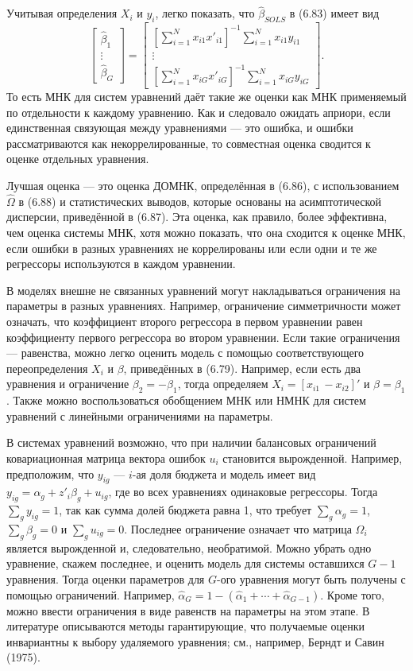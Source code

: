 Учитывая определения $X_i$ и $y_i$, легко показать, что $\hat{\beta}_{SOLS}$ в (6.83) имеет вид
\[
\begin{bmatrix} \hat{\beta}_1 \\ \vdots \\ \hat{\beta}_G \end{bmatrix} = \begin{bmatrix} \left[ \sum_{i=1}^N x_{i1} x'_{i1} \right]^{-1} \sum_{i=1}^N x_{i1} y_{i1} \\ \vdots \\ \left[ \sum_{i=1}^N x_{iG} x'_{iG} \right]^{-1} \sum_{i=1}^N x_{iG} y_{iG} \end{bmatrix}.
\]
То есть МНК для систем уравнений даёт такие же оценки как МНК применяемый по отдельности к каждому уравнению.  Как и следовало ожидать априори, если единственная связующая между уравнениями --- это ошибка, и ошибки рассматриваются как некоррелированные, то совместная оценка сводится к оценке отдельных уравнения.

Лучшая оценка --- это оценка ДОМНК, определённая в (6.86), с использованием $\hat{\Omega}$ в (6.88) и статистических выводов, которые основаны на асимптотической дисперсии, приведённой в (6.87). Эта оценка, как правило, более эффективна, чем оценка системы МНК, хотя можно показать, что она сходится к оценке МНК, если ошибки в разных  уравнениях не коррелированы или если одни и те же регрессоры используются в каждом уравнении.

В моделях внешне не связанных уравнений могут накладываться ограничения на параметры в разных уравнениях. Например, ограничение симметричности может означать, что коэффициент второго регрессора в первом уравнении равен коэффициенту первого регрессора во втором уравнении. Если такие ограничения --- равенства, можно легко оценить модель с помощью соответствующего переопределения $X_i$ и $\beta$, приведённых в (6.79). Например, если есть два уравнения и ограничение $\beta_2=-\beta_1$, тогда определяем $X_i=[x_{i1} \, -x_{i2}]'$ и $\beta=\beta_1$. Также можно воспользоваться обобщением МНК или НМНК для систем уравнений с линейными ограничениями на параметры.

В системах уравнений возможно, что при наличии балансовых ограничений ковариационная матрица вектора ошибок $u_i$ становится вырожденной. Например, предположим, что $y_{ig}$ --- $i$-ая доля бюджета и модель имеет вид $y_{ig}= \alpha_g + z'_i \beta_g + u_{ig}$, где во всех уравнениях одинаковые регрессоры. Тогда $\sum_g y_{ig}=1$, так как сумма долей бюджета равна 1, что требует $\sum_g \alpha_{g}=1$, $\sum_g \beta_{g}=0$ и $\sum_g u_{ig}=0$. Последнее ограничение означает что матрица $\Omega_i$ является вырожденной и, следовательно, необратимой. Можно убрать одно уравнение, скажем последнее, и оценить модель для системы оставшихся $G-1$ уравнения. Тогда оценки параметров для $G$-ого уравнения могут быть получены с помощью ограничений. Например, $\hat{\alpha}_G=1-(\hat{\alpha}_1 + \cdots + \hat{\alpha}_{G-1})$. Кроме того, можно ввести ограничения в виде равенств на параметры на этом этапе. В литературе описываются методы гарантирующие, что получаемые оценки инвариантны к выбору удаляемого уравнения; см., например, Берндт и Савин (1975).

